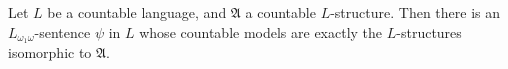 Let $L$ be a countable language, and $\mathfrak{A}$ a countable $L$-structure. Then there is an $L_{\omega_1\omega}$-sentence $\psi$ in $L$ whose countable models are exactly the $L$-structures isomorphic to $\mathfrak{A}$.
